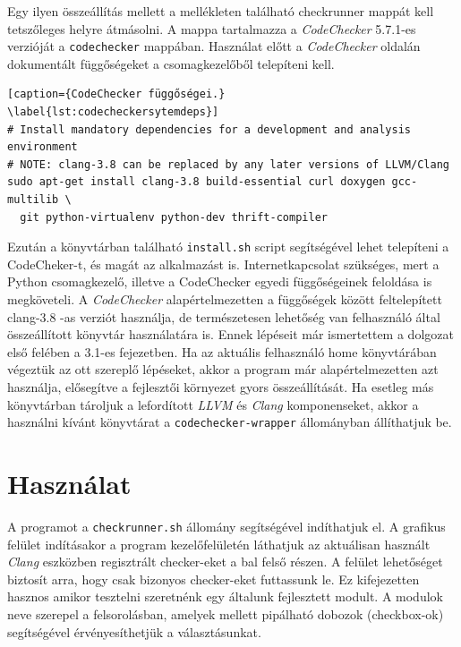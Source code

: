 \documentclass[a4paper,12pt]{report}
\begin{document}
Egy ilyen összeállítás mellett a mellékleten található checkrunner mappát kell tetszőleges helyre átmásolni. A mappa tartalmazza a \emph{CodeChecker} 5.7.1-es verzióját a \texttt{codechecker} mappában. Használat előtt a \emph{CodeChecker} oldalán dokumentált függőségeket a csomagkezelőből telepíteni kell.

\begin{lstlisting}[caption={CodeChecker függőségei.}
\label{lst:codecheckersytemdeps}]
# Install mandatory dependencies for a development and analysis environment
# NOTE: clang-3.8 can be replaced by any later versions of LLVM/Clang
sudo apt-get install clang-3.8 build-essential curl doxygen gcc-multilib \
  git python-virtualenv python-dev thrift-compiler
\end{lstlisting}

Ezután a könyvtárban található \texttt{install.sh} script segítségével lehet telepíteni a CodeCheker-t, és magát az alkalmazást is. Internetkapcsolat szükséges, mert a Python csomagkezelő, illetve a CodeChecker egyedi függőségeinek feloldása is megköveteli. A \emph{CodeChecker} alapértelmezetten a függőségek között feltelepített clang-3.8 -as verziót használja, de természetesen lehetőség van felhasználó által összeállított könyvtár használatára is. Ennek lépéseit már ismertettem a dolgozat első felében a 3.1-es fejezetben. Ha az aktuális felhasználó home könyvtárában végeztük az ott szereplő lépéseket, akkor a program már alapértelmezetten azt használja, elősegítve a fejlesztői környezet gyors összeállítását. Ha esetleg más könyvtárban tároljuk a lefordított \emph{LLVM} és \emph{Clang} komponenseket, akkor a használni kívánt könyvtárat a \texttt{codechecker-wrapper} állományban állíthatjuk be.

\section{Használat}
A programot a \texttt{checkrunner.sh} állomány segítségével indíthatjuk el. A grafikus felület indításakor a program kezelőfelületén láthatjuk az aktuálisan használt \emph{Clang} eszközben regisztrált checker-eket a bal felső részen. A felület lehetőséget biztosít arra, hogy csak bizonyos checker-eket futtassunk le. Ez kifejezetten hasznos amikor tesztelni szeretnénk egy általunk fejlesztett modult. A modulok neve szerepel a felsorolásban, amelyek mellett pipálható dobozok (checkbox-ok) segítségével érvényesíthetjük a választásunkat.
\end{document}
